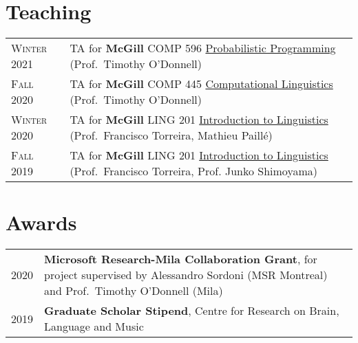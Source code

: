 \documentclass[11pt,a4paper]{article}
\begin{document}


\section{Teaching} 
\begin{longtable}{p{2cm}|p{14.5cm}}
\textsc{Winter 2021}&TA for \textbf{McGill} COMP 596 \uline{Probabilistic Programming} (Prof.\ Timothy O'Donnell)\\
\textsc{Fall 2020}&TA for \textbf{McGill} COMP 445 \uline{Computational Linguistics} (Prof.\ Timothy O'Donnell)\\
\textsc{Winter 2020}&TA for \textbf{McGill} LING 201 \uline{Introduction to Linguistics} (Prof.\ Francisco Torreira, Mathieu Paillé)\\
\textsc{Fall 2019}	&TA for \textbf{McGill} LING 201 \uline{Introduction to Linguistics} (Prof.\ Francisco Torreira, Prof. Junko Shimoyama)\\
\end{longtable}

\section{Awards} 
\begin{longtable}{p{2cm}|p{14.5cm}}
\textsc{2020}&\textbf{Microsoft Research-Mila Collaboration Grant}, for project supervised by Alessandro Sordoni (MSR Montreal) and Prof.\ Timothy O'Donnell (Mila)\\
\textsc{2019}&\textbf{Graduate Scholar Stipend}, Centre for Research on Brain, Language and Music\\
\end{longtable}
\end{document}
